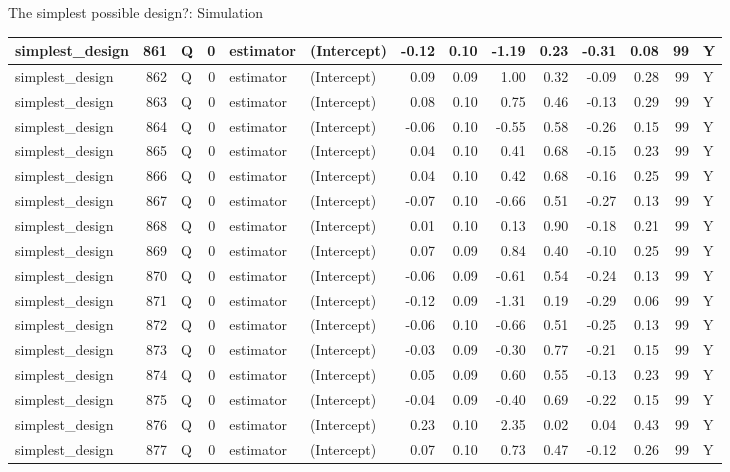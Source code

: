 \documentclass[
  11pt,
  ignorenonframetext,
]{beamer}
\begin{document}
\begin{frame}[fragile]{The simplest possible design?: Simulation}
\begin{tabular}{l|r|l|r|l|l|r|r|r|r|r|r|r|l}
\hline
simplest\_design & 861 & Q & 0 & estimator & (Intercept) & -0.12 & 0.10 & -1.19 & 0.23 & -0.31 & 0.08 & 99 & Y\\
\hline
simplest\_design & 862 & Q & 0 & estimator & (Intercept) & 0.09 & 0.09 & 1.00 & 0.32 & -0.09 & 0.28 & 99 & Y\\
\hline
simplest\_design & 863 & Q & 0 & estimator & (Intercept) & 0.08 & 0.10 & 0.75 & 0.46 & -0.13 & 0.29 & 99 & Y\\
\hline
simplest\_design & 864 & Q & 0 & estimator & (Intercept) & -0.06 & 0.10 & -0.55 & 0.58 & -0.26 & 0.15 & 99 & Y\\
\hline
simplest\_design & 865 & Q & 0 & estimator & (Intercept) & 0.04 & 0.10 & 0.41 & 0.68 & -0.15 & 0.23 & 99 & Y\\
\hline
simplest\_design & 866 & Q & 0 & estimator & (Intercept) & 0.04 & 0.10 & 0.42 & 0.68 & -0.16 & 0.25 & 99 & Y\\
\hline
simplest\_design & 867 & Q & 0 & estimator & (Intercept) & -0.07 & 0.10 & -0.66 & 0.51 & -0.27 & 0.13 & 99 & Y\\
\hline
simplest\_design & 868 & Q & 0 & estimator & (Intercept) & 0.01 & 0.10 & 0.13 & 0.90 & -0.18 & 0.21 & 99 & Y\\
\hline
simplest\_design & 869 & Q & 0 & estimator & (Intercept) & 0.07 & 0.09 & 0.84 & 0.40 & -0.10 & 0.25 & 99 & Y\\
\hline
simplest\_design & 870 & Q & 0 & estimator & (Intercept) & -0.06 & 0.09 & -0.61 & 0.54 & -0.24 & 0.13 & 99 & Y\\
\hline
simplest\_design & 871 & Q & 0 & estimator & (Intercept) & -0.12 & 0.09 & -1.31 & 0.19 & -0.29 & 0.06 & 99 & Y\\
\hline
simplest\_design & 872 & Q & 0 & estimator & (Intercept) & -0.06 & 0.10 & -0.66 & 0.51 & -0.25 & 0.13 & 99 & Y\\
\hline
simplest\_design & 873 & Q & 0 & estimator & (Intercept) & -0.03 & 0.09 & -0.30 & 0.77 & -0.21 & 0.15 & 99 & Y\\
\hline
simplest\_design & 874 & Q & 0 & estimator & (Intercept) & 0.05 & 0.09 & 0.60 & 0.55 & -0.13 & 0.23 & 99 & Y\\
\hline
simplest\_design & 875 & Q & 0 & estimator & (Intercept) & -0.04 & 0.09 & -0.40 & 0.69 & -0.22 & 0.15 & 99 & Y\\
\hline
simplest\_design & 876 & Q & 0 & estimator & (Intercept) & 0.23 & 0.10 & 2.35 & 0.02 & 0.04 & 0.43 & 99 & Y\\
\hline
simplest\_design & 877 & Q & 0 & estimator & (Intercept) & 0.07 & 0.10 & 0.73 & 0.47 & -0.12 & 0.26 & 99 & Y\\

\end{tabular}
\end{frame}
\end{document}
